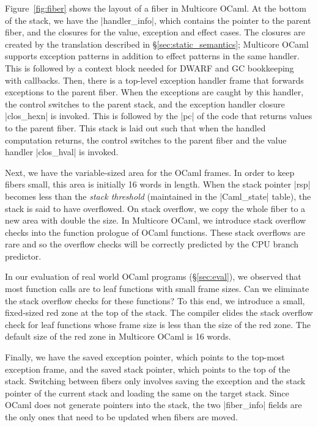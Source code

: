 \documentclass[sigplan,screen]{acmart}
\begin{document}
Figure~\ref{fig:fiber} shows the layout of a fiber in Multicore OCaml. At the
bottom of the stack, we have the |handler_info|, which contains the pointer to
the parent fiber, and the closures for the value, exception and effect cases.
The closures are created by the translation described in
\S\ref{sec:static_semantics}; Multicore OCaml supports exception patterns in
addition to effect patterns in the same handler. This is followed by a context
block needed for DWARF and GC bookkeeping with callbacks. Then, there is a
top-level exception handler frame that forwards exceptions to the parent fiber.
When the exceptions are caught by this handler, the control switches to the
parent stack, and the exception handler closure |clos_hexn| is invoked. This is
followed by the |pc| of the code that returns values to the parent
fiber. This stack is laid out such that when the handled computation returns,
the control switches to the parent fiber and the value handler |clos_hval|
is invoked.

Next, we have the variable-sized area for the OCaml frames. In order to keep
fibers small, this area is initially 16 words in length. When the stack pointer
|rsp| becomes less than the \emph{stack threshold} (maintained in the
|Caml_state| table), the stack is said to have overflowed. On stack overflow,
we copy the whole fiber to a new area with double the size. In Multicore OCaml,
we introduce stack overflow checks into the function prologue of OCaml
functions. These stack overflows are rare and so the overflow checks will be
correctly predicted by the CPU branch predictor.

In our evaluation of real world OCaml programs (\S\ref{sec:eval}), we observed
that most function calls are to leaf functions with small frame sizes. Can we
eliminate the stack overflow checks for these functions? To this end, we
introduce a small, fixed-sized red zone at the top of the stack. The compiler
elides the stack overflow check for leaf functions whose frame size is less
than the size of the red zone. The default size of the red zone in Multicore
OCaml is 16 words.

Finally, we have the saved exception pointer, which points to the top-most
exception frame, and the saved stack pointer, which points to the top of the
stack. Switching between fibers only involves saving the exception and the
stack pointer of the current stack and loading the same on the target stack.
Since OCaml does not generate pointers into the stack, the two |fiber_info|
fields are the only ones that need to be updated when fibers are moved.
\end{document}
